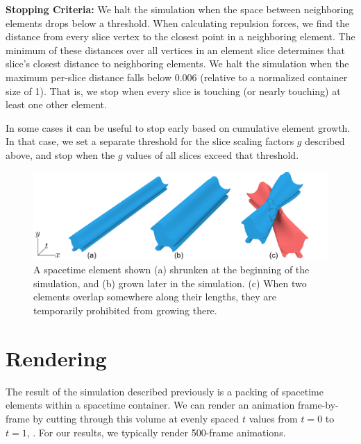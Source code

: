 \textbf{Stopping Criteria:} We halt the simulation when the space between
neighboring elements drops below a threshold.  When calculating 
repulsion forces, we find the distance from every slice vertex
to the closest point in a neighboring element.  The minimum of these
distances over all vertices in an element slice determines that slice's
closest distance to neighboring elements.  We halt the simulation
when the maximum per-slice distance falls below 0.006 (relative to a normalized
container size of 1).  That is, we stop when every slice is touching
(or nearly touching) at least one other element.

In some cases it can be useful to stop early based on cumulative element
growth.  In that case, we set a separate threshold for the slice scaling
factors $g$ described above, and stop when the $g$ values of all
slices exceed that threshold.

\begin{figure}
\centering
\includegraphics[width=1.0\textwidth]{figures/animationpak/growth.pdf} 
\caption[Element growths]
{\label{fig_animationpak_growth} 
A spacetime element shown (a) shrunken at the beginning of the simulation,
and (b) grown later in the simulation. (c) When two elements overlap
somewhere along their lengths, they are temporarily prohibited from growing
there.
}
\end{figure}


\section{Rendering}
\label{animationpak_rendering}



The result of the simulation described previously is a packing of spacetime 
elements within a spacetime container.  We can render an
animation frame-by-frame by cutting through this volume at 
evenly spaced $t$ values from $t=0$ to $t=1$, .  For our results, we
typically render 500-frame animations.


